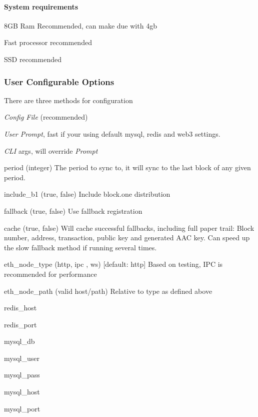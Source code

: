 \paragraph*{System requirements}


\begin{DoxyEnumerate}
\item 8\+GB Ram Recommended, can make due with 4gb
\item Fast processor recommended
\item S\+SD recommended
\end{DoxyEnumerate}

\label{_snapshot-install-manual-config}%
 \subsubsection*{User Configurable Options}

There are three methods for configuration
\begin{DoxyEnumerate}
\item {\itshape Config File} (recommended)
\item {\itshape User Prompt}, fast if your using default mysql, redis and web3 settings.
\item {\itshape C\+LI} args, will override {\itshape Prompt}
\end{DoxyEnumerate}
\begin{DoxyItemize}
\item {\ttfamily period} (integer) The period to sync to, it will sync to the last block of any given period.
\item {\ttfamily include\+\_\+b1} (true, false) Include block.\+one distribution
\item {\ttfamily fallback} (true, false) Use fallback registration
\item {\ttfamily cache} (true, false) Will cache successful fallbacks, including full paper trail\+: Block number, address, transaction, public key and generated A\+AC key. Can speed up the slow fallback method if running several times.
\item {\ttfamily eth\+\_\+node\+\_\+type} (http, ipc , ws) \mbox{[}default\+: http\mbox{]} Based on testing, I\+PC is recommended for performance
\item {\ttfamily eth\+\_\+node\+\_\+path} (valid host/path) Relative to type as defined above
\item {\ttfamily redis\+\_\+host}
\item {\ttfamily redis\+\_\+port}
\item {\ttfamily mysql\+\_\+db}
\item {\ttfamily mysql\+\_\+user}
\item {\ttfamily mysql\+\_\+pass}
\item {\ttfamily mysql\+\_\+host}
\item {\ttfamily mysql\+\_\+port}
\end{DoxyItemize}

